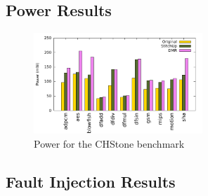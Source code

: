 \subsection{Power Results}

\begin{figure}[h]
\centering
\includegraphics[width=2.5in]{./graphs/chstone_absolute_power_24_09_2015.pdf}
\caption{Power for the CHStone benchmark}
\label{fig:power_result}
\end{figure}

\subsection{Fault Injection Results}

